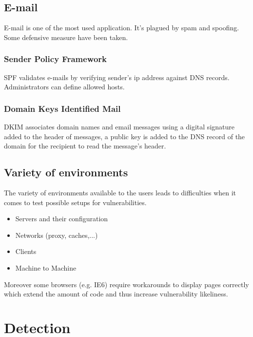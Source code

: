 \subsection{E-mail}
E-mail is one of the most used application. It's plagued by spam and
spoofing. Some defensive measure have been taken.

\subsubsection{Sender Policy Framework}
SPF validates e-mails by verifying sender's ip address against DNS records. Administrators can define allowed hosts.

\subsubsection{Domain Keys Identified Mail}
DKIM associates domain names and email messages using a digital signature added to the header of messages, a public key is added to the DNS record of the domain for the recipient to read the message's header.

\subsection{Variety of environments}
The variety of environments available to the users leads to
difficulties when it comes to test possible setups for
vulnerabilities.\\
\begin{itemize}
\item Servers and their configuration
\item Networks (proxy, caches,...)
\item Clients
\item Machine to Machine
\end{itemize}
Moreover some browsers (e.g. IE6) require workarounds to
display pages correctly which extend the amount of code and thus
increase vulnerability likeliness.

\section{Detection}
